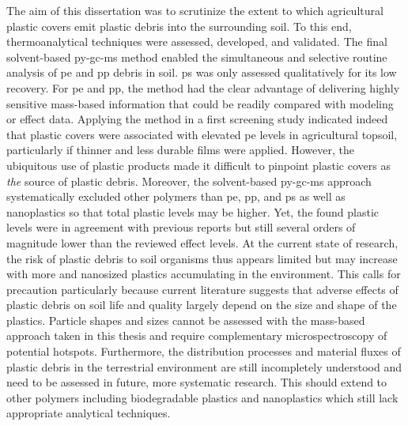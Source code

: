 The aim of this dissertation was to scrutinize the extent to which agricultural plastic covers emit plastic debris into the surrounding soil. To this end, thermoanalytical techniques were assessed, developed, and validated. The final solvent-based \ac{py-gc-ms} method enabled the simultaneous and selective routine analysis of \ac{pe} and \ac{pp} debris in soil. \Ac{ps} was only assessed qualitatively for its low recovery. For \ac{pe} and \ac{pp}, the method had the clear advantage of delivering highly sensitive mass-based information that could be readily compared with modeling or effect data. Applying the method in a first screening study indicated indeed that plastic covers were associated with elevated \ac{pe} levels in agricultural topsoil, particularly if thinner and less durable films were applied. However, the ubiquitous use of plastic products made it difficult to pinpoint plastic covers as \emph{the} source of plastic debris. Moreover, the solvent-based \ac{py-gc-ms} approach systematically excluded other polymers than \ac{pe}, \ac{pp}, and \ac{ps} as well as nanoplastics so that total plastic levels may be higher. Yet, the found plastic levels were in agreement with previous reports but still several orders of magnitude lower than the reviewed effect levels.
At the current state of research, the risk of plastic debris to soil organisms thus appears limited but may increase with more and nanosized plastics accumulating in the environment. This calls for precaution particularly because current literature suggests that adverse effects of plastic debris on soil life and quality largely depend on the size and shape of the plastics. Particle shapes and sizes cannot be assessed with the mass-based approach taken in this thesis and require complementary microspectroscopy of potential hotspots.
Furthermore, the distribution processes and material fluxes of plastic debris in the terrestrial environment are still incompletely understood and need to be assessed in future, more systematic research. This should extend to other polymers including biodegradable plastics and nanoplastics which still lack appropriate analytical techniques.
